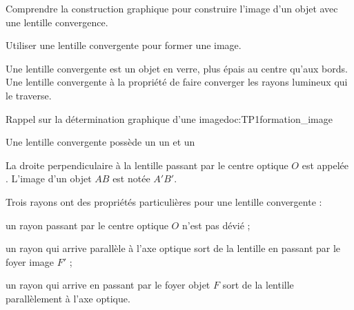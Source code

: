 \teteSndLumi



\begin{objectifs}
  \item Comprendre la construction graphique pour construire l'image d'un objet avec une lentille convergence.
  \item Utiliser une lentille convergente pour former une image.
\end{objectifs}

\begin{contexte}
  Une lentille convergente est un objet en verre, plus épais au centre qu'aux bords.
  Une lentille convergente à la propriété de faire converger les rayons lumineux qui le traverse.
  
\end{contexte}
\bigskip


\begin{doc}{Rappel sur la détermination graphique d'une image}{doc:TP1formation_image}
  \begin{encart}
    Une lentille convergente possède un  un et un 
  \end{encart}
  La droite perpendiculaire à la lentille passant par le centre optique $O$ est appelée .
  L'image d'un objet $AB$ est notée $A'B'$.
  
  \begin{center}
  \end{center}
  
  \begin{encart}
    Trois rayons ont des propriétés particulières pour une lentille convergente :
    \begin{listePoints}
      \item un rayon passant par le centre optique $O$ n'est pas dévié ;
      \item un rayon qui arrive parallèle à l'axe optique sort de la lentille en passant par le foyer image $F'$ ;
      \item un rayon qui arrive en passant par le foyer objet $F$ sort de la lentille parallèlement à l'axe optique.
    \end{listePoints}
  \end{encart}
\end{doc}

